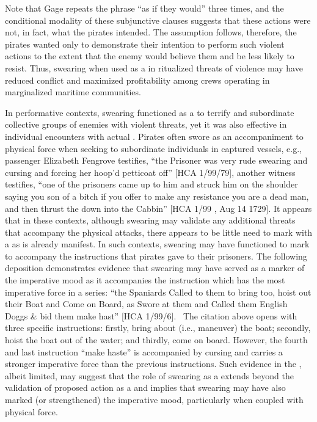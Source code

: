 Note that Gage repeats the phrase “as if they would” three times, and the  conditional modality of these subjunctive clauses suggests that these actions were not, in fact, what the pirates intended. The assumption follows, therefore, the pirates wanted only to demonstrate their intention to perform such violent actions to the extent that the enemy would believe them and be less likely to resist. Thus, swearing when used as a  in ritualized threats of violence may have reduced conflict and maximized profitability among crews operating in marginalized maritime communities. 

In performative contexts, swearing functioned as a  to terrify and subordinate collective groups of enemies with violent threats, yet it was also effective in individual encounters with actual . Pirates often swore as an accompaniment to physical force when seeking to subordinate individuals in captured vessels, e.g., passenger Elizabeth Fengrove testifies, “the Prisoner was very rude swearing and cursing and forcing her hoop’d petticoat off” [HCA 1/99/79], another witness testifies, “one of the prisoners came up to him and struck him on the shoulder saying you son of a bitch if you offer to make any resistance you are a dead man, and then thrust the  down into the Cabbin” [HCA 1/99 , Aug 14 1729]. It appears that in these contexts, although swearing may validate any additional threats that accompany the physical attacks, there appears to be little need to mark  with a  as  is already manifest. In such contexts, swearing may have functioned to mark  to accompany the instructions that pirates gave to their prisoners. The following deposition demonstrates evidence that swearing may have served as a marker of the imperative mood as it accompanies the instruction which has the most imperative force in a series: “the Spaniards Called to them to bring too, hoist out their Boat and Come on Board, as Swore at them and Called them English Doggs \& bid them make hast” [HCA 1/99/6]. ~The citation above opens with three specific instructions: firstly, bring about (i.e., maneuver) the boat; secondly, hoist the boat out of the water; and thirdly, come on board. However, the fourth and last instruction “make haste” is accompanied by cursing and carries a stronger imperative force than the previous instructions. Such evidence in the , albeit limited, may suggest that the role of swearing as a  extends beyond the validation of proposed action as a  and implies that swearing may have also marked (or strengthened) the imperative mood, particularly when coupled with physical force. 


